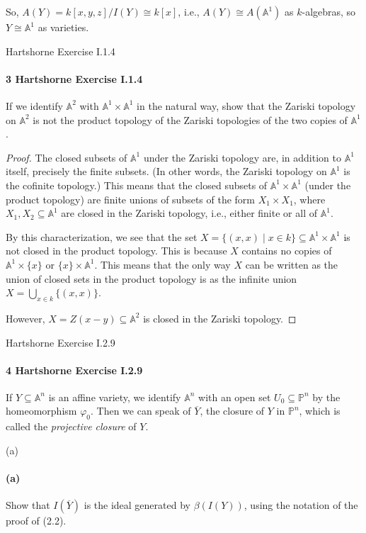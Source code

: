 \documentclass[12pt]{article}
\newlength{\myparskip}
\newenvironment{fullbox}{\begin{lrbox}{\savefullbox}\begin{minipage}{\dimexpr\textwidth-2\fboxsep\relax}\setlength{\parskip}{\myparskip}}{\end{minipage}\end{lrbox}\framebox[\textwidth]{\usebox{\savefullbox}}}
\newenvironment{pbox}[1][]{\begin{fullbox}\ifx#1\empty\else\paragraph{#1}\fi}{\end{fullbox}}
\renewcommand{\phi}{\varphi}
\newcommand{\<}{\langle}
\renewcommand{\>}{\rangle}
\newcommand{\isom}{\cong}
\newcommand{\clo}{\overline}
\newcommand{\A}{\mathbb{A}}
\renewcommand{\P}{\mathbb{P}}
\begin{document}
So, $A(Y) = k[x, y, z]/I(Y) \isom k[x]$, i.e., $A(Y) \isom A(\A^1)$ as $k$-algebras, so $Y \isom \A^1$ as varieties.


\newpage
\begin{pbox}[3 Hartshorne Exercise I.1.4]
    If we identify $\A^2$ with $\A^1 \times \A^1$ in the natural way, show that the Zariski topology on $\A^2$ is not the product topology of the Zariski topologies of the two copies of $\A^1$.
\end{pbox}

\begin{proof}
    The closed subsets of $\A^1$ under the Zariski topology are, in addition to $\A^1$ itself, precisely the finite subsets. (In other words, the Zariski topology on $\A^1$ is the cofinite topology.) This means that the closed subsets of $\A^1 \times \A^1$ (under the product topology) are finite unions of subsets of the form $X_1 \times X_1$, where $X_1, X_2 \subseteq \A^1$ are closed in the Zariski topology, i.e., either finite or all of $\A^1$.

    By this characterization, we see that the set $X = \{(x, x) \mid x \in k\} \subseteq \A^1 \times \A^1$ is not closed in the product topology. This is because $X$ contains no copies of $\A^1 \times \{x\}$ or $\{x\} \times \A^1$. This means that the only way $X$ can be written as the union of closed sets in the product topology is as the infinite union $X = \bigcup_{x \in k} \{(x, x)\}$.

    However, $X = Z(x - y) \subseteq \A^2$ is closed in the Zariski topology.

\end{proof}


\newpage
\begin{pbox}[4 Hartshorne Exercise I.2.9]
    If $Y \subseteq \A^n$ is an affine variety, we identify $\A^n$ with an open set $U_0 \subseteq \P^n$ by the homeomorphism $\phi_0$. Then we can speak of $\clo{Y}$, the closure of $Y$ in $\P^n$, which is called the \textit{projective closure} of $Y$.
\end{pbox}

\begin{pbox}[(a)]
    Show that $I(\clo{Y})$ is the ideal generated by $\beta(I(Y))$, using the notation of the proof of (2.2).
\end{pbox}
\end{document}
